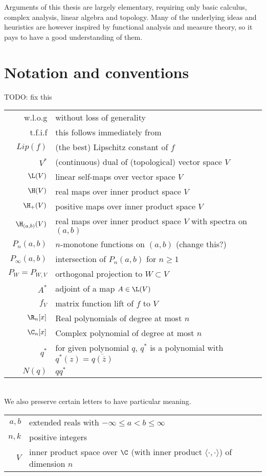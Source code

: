 Arguments of this thesis are largely elementary, requiring only basic calculus, complex analysis, linear algebra and topology. Many of the underlying ideas and heuristics are however inspired by functional analysis and measure theory, so it pays to have a good understanding of them.

\section{Notation and conventions}

TODO: fix this

\begin{tabular}{r l}
	w.l.o.g & without loss of generality \\
	t.f.i.f & this follows immediately from \\
	$Lip(f)$ & (the best) Lipschitz constant of $f$ \\
	$V^{*}$ & (continuous) dual of (topological) vector space $V$ \\
	$\L(V)$ & linear self-maps over vector space $V$ \\
	$\H(V)$ & real maps over inner product space $V$ \\
	$\H_{+}(V)$ & positive maps over inner product space $V$ \\
	$\H_{(a, b)}(V)$ & real maps over inner product space $V$ with spectra on $(a, b)$ \\
	$P_{n}(a, b)$ & $n$-monotone functions on $(a, b)$ (change this?) \\
	$P_{\infty}(a, b)$ & intersection of $P_{n}(a, b)$ for $n \geq 1$ \\
	$P_{W} = P_{W, V}$ & orthogonal projection to $W \subset V$ \\
	$A^{*}$ & adjoint of a map $A \in \L(V)$ \\
	$f_{V}$ & matrix function lift of $f$ to $V$ \\
	$\R_{n}[x]$ & Real polynomials of degree at most $n$\\
	$\C_{n}[x]$ & Complex polynomial of degree at most $n$\\
	$q^{*}$ & for given polynomial $q$, $q^{*}$ is a polynomial with $q^{*}(z) = \overline{q(\overline{z})}$ \\
	$N(q)$ & $q q^{*}$
\end{tabular}
\\
We also preserve certain letters to have particular meaning.
\\
\begin{tabular}{r l}
	$a, b$ & extended reals with $-\infty \leq a < b \leq \infty$ \\ 
	$n, k$ & positive integers \\
	$V$ & inner product space over $\C$ (with inner product $\langle \cdot, \cdot \rangle$) of dimension $n$ \\
\end{tabular}

